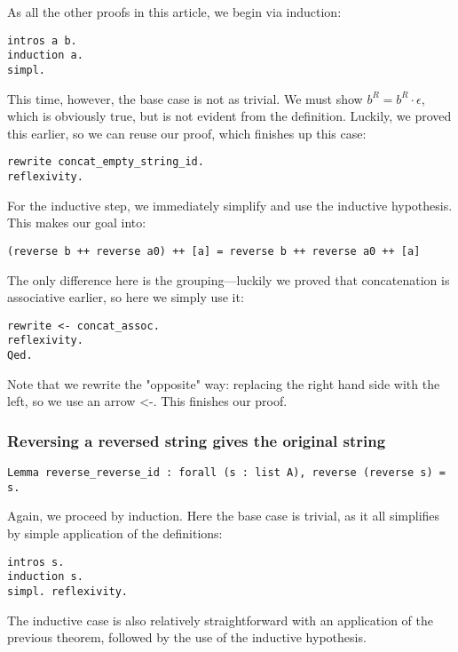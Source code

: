 As all the other proofs in this article, we begin via induction:

\begin{verbatim}
intros a b.
induction a.
simpl.
\end{verbatim}

This time, however, the base case is not as trivial.
We must show $b^R = b^R \cdot \epsilon$, which is obviously true, but is not evident from the definition.
Luckily, we proved this earlier, so we can reuse our proof, which finishes up this case:

\begin{verbatim}
rewrite concat_empty_string_id.
reflexivity.
\end{verbatim}

For the inductive step, we immediately simplify and use the inductive hypothesis.
This makes our goal into:

\begin{verbatim}
(reverse b ++ reverse a0) ++ [a] = reverse b ++ reverse a0 ++ [a]
\end{verbatim}

The only difference here is the grouping---luckily we proved that concatenation is associative earlier, so here we simply use it:

\begin{verbatim}
rewrite <- concat_assoc.
reflexivity.
Qed.
\end{verbatim}

Note that we rewrite the "opposite" way: replacing the right hand side with the left, so we use an arrow <-.
This finishes our proof.

\subsubsection{Reversing a reversed string gives the original string}

\begin{verbatim}
Lemma reverse_reverse_id : forall (s : list A), reverse (reverse s) = s.
\end{verbatim}

Again, we proceed by induction.
Here the base case is trivial, as it all simplifies by simple application of the definitions:

\begin{verbatim}
intros s.
induction s.
simpl. reflexivity.
\end{verbatim}

The inductive case is also relatively straightforward with an application of the previous theorem, followed by the use of the inductive hypothesis.

